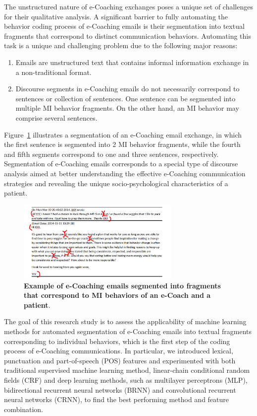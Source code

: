 \documentclass{amia}
\begin{document}
The unstructured nature of e-Coaching exchanges poses a unique set of challenges for their qualitative analysis. A significant barrier to fully automating the behavior coding process of e-Coaching emails is their segmentation into textual fragments that correspond to distinct communication behaviors. Automating this task is a unique and challenging problem due to the following major reasons:

\begin{enumerate}
\item Emails are unstructured text that contains informal information exchange in a non-traditional format.
\item Discourse segments in e-Coaching emails do not necessarily correspond to sentences or collection of sentences. One sentence can be segmented into multiple MI behavior fragments. On the other hand, an MI behavior may comprise several sentences.
\end{enumerate}

Figure~\ref{fig:text-segment} illustrates a segmentation of an e-Coaching email exchange, in which the first sentence is segmented into 2 MI behavior fragments, while the fourth and fifth segments correspond to one and three sentences, respectively. Segmentation of e-Coaching emails corresponds to a special type of discourse analysis \cite{webber2012discourse} aimed at better understanding the effective e-Coaching communication strategies and revealing the unique socio-psychological characteristics of a patient.

\begin{figure}[!htb]
    \centering
    \includegraphics[width=0.7\textwidth]{figures/segment-example.png}
    \caption{\textbf{Example of e-Coaching emails segmented into fragments that correspond to MI behaviors of an e-Coach and a patient}.}
    \label{fig:text-segment}
\end{figure}

The goal of this research study is to assess the applicability of machine learning methods for automated segmentation of e-Coaching emails into textual fragments corresponding to individual behaviors, which is the first step of the coding process of e-Coaching communications. In particular, we introduced lexical, punctuation and  part-of-speech (POS) features and experimented with both traditional supervised machine learning method, linear-chain conditional random fields (CRF) and deep learning methods, such as multilayer perceptrons (MLP), bidirectional recurrent neural networks (BRNN) and convolutional recurrent neural networks (CRNN), to find the best performing method and feature combination. 
\end{document}
